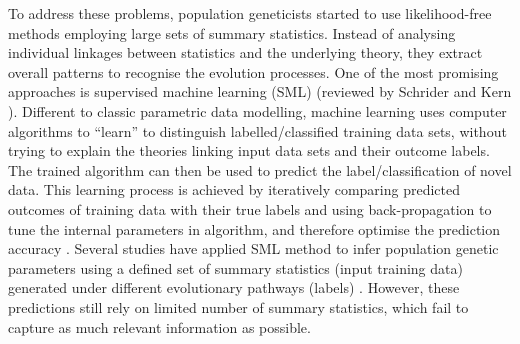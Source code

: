 \documentclass[a4paper,12pt,oneside]{extarticle}
\begin{document}
To address these problems, population geneticists started to use likelihood-free methods employing large sets of summary statistics. Instead of analysing individual linkages between statistics and the underlying theory, they extract overall patterns to recognise the evolution processes. One of the most promising approaches is supervised machine learning (SML) (reviewed by Schrider and Kern \cite{18}). Different to classic parametric data modelling, machine learning uses computer algorithms to “learn” to distinguish labelled/classified training data sets, without trying to explain the theories linking input data sets and their outcome labels. The trained algorithm can then be used to predict the label/classification of novel data. This learning process is achieved by iteratively comparing predicted outcomes of training data with their true labels and using back-propagation to tune the internal parameters in algorithm, and therefore optimise the prediction accuracy \cite{25}. Several studies have applied SML method to infer population genetic parameters using a defined set of summary statistics (input training data) generated under different evolutionary pathways (labels) \cite{19,20,21,22}. However, these predictions still rely on limited number of summary statistics, which fail to capture as much relevant information as possible.
\end{document}
